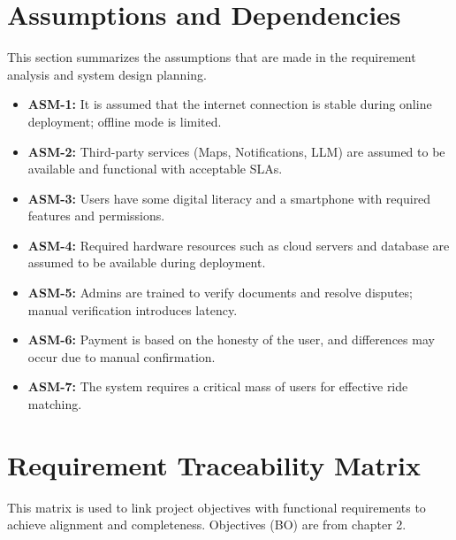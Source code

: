 \section{Assumptions and Dependencies}

This section summarizes the assumptions that are made in the requirement analysis and system design planning.

\begin{itemize}
\item \textbf{ASM-1:} It is assumed that the internet connection is stable during online deployment; offline mode is limited.
\item \textbf{ASM-2:} Third-party services (Maps, Notifications, LLM) are assumed to be available and functional with acceptable SLAs.
\item \textbf{ASM-3:} Users have some digital literacy and a smartphone with required features and permissions.
\item \textbf{ASM-4:} Required hardware resources such as cloud servers and database are assumed to be available during deployment.
\item \textbf{ASM-5:} Admins are trained to verify documents and resolve disputes; manual verification introduces latency.
\item \textbf{ASM-6:} Payment is based on the honesty of the user, and differences may occur due to manual confirmation.
\item \textbf{ASM-7:} The system requires a critical mass of users for effective ride matching.
\end{itemize}

\clearpage
\section{Requirement Traceability Matrix}

This matrix is used to link project objectives with functional requirements to achieve alignment and completeness. Objectives (BO) are from chapter 2.

